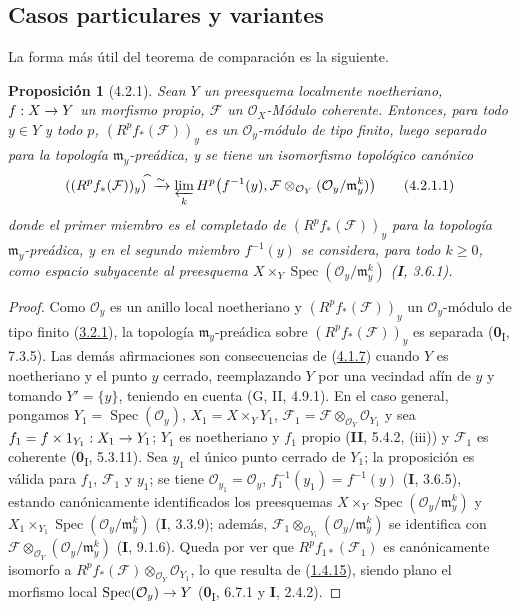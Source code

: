 \documentclass[10pt,oneside,openany]{book}
\theoremstyle{egaenv}\newtheorem*{env}{---}
\theoremstyle{egastatement}
\newtheorem*{proposition}{Proposición}
\theoremstyle{egadescription}
\newcommand{\oldpage}[2][]{\marginnote{\normalfont\scriptsize\textbf{#1}\,|\,#2}\ignorespaces}
\renewcommand{\geq}{\geqslant}
\renewcommand{\to}{\mathchoice{\longrightarrow}{\rightarrow}{\rightarrow}{\rightarrow}}
\begin{document}
\subsection{Casos particulares y variantes}
\label{subsection:III.4.2}
\label{subsection:III.4.2-fr}

La forma más útil del teorema de comparación  es la
siguiente.

\begin{proposition}[4.2.1]
\label{III.4.2.1-fr}
Sean $Y$ un preesquema localmente noetheriano, $f:X\to Y$ un morfismo
propio, $\mathcal F$ un $\mathcal O_X$-Módulo coherente. Entonces, para todo
$y\in Y$ y todo $p$, $(R^pf_*(\mathcal F))_y$ es
\oldpage[III]{130}
un $\mathcal O_y$-módulo de tipo finito, luego separado para la topología
$\mathfrak m_y$-preádica, y se tiene un isomorfismo topológico canónico
\[
((R^pf_*(\mathcal F))_y)^{\widehat{\,}}
\xrightarrow{\sim}
\varprojlim_kH^p\bigl(f^{-1}(y),
\mathcal F\otimes_{\mathcal O_Y}(\mathcal O_y/\mathfrak m_y^k)\bigr)
\tag{4.2.1.1}\label{III.4.2.1.1-fr}
\]
donde el primer miembro es el completado de $(R^pf_*(\mathcal F))_y$ para la
topología $\mathfrak m_y$-preádica, y en el segundo miembro $f^{-1}(y)$ se
considera, para todo $k\geq0$, como espacio subyacente al preesquema
$X\times_Y\operatorname{Spec}(\mathcal O_y/\mathfrak m_y^k)$
\textup{(\textbf{I}, 3.6.1)}.
\end{proposition}

\begin{proof}
Como $\mathcal O_y$ es un anillo local noetheriano y
$(R^pf_*(\mathcal F))_y$ un $\mathcal O_y$-módulo de tipo finito
(\hyperref[III.3.2.1-fr]{3.2.1}), la topología $\mathfrak m_y$-preádica
sobre $(R^pf_*(\mathcal F))_y$ es separada (\textbf{0}\textsubscript{I}, 7.3.5). Las
demás afirmaciones son consecuencias de (\hyperref[III.4.1.7-fr]{4.1.7})
cuando $Y$ es noetheriano y el punto $y$ cerrado, reemplazando $Y$ por una
vecindad afín de $y$ y tomando $Y'=\{y\}$, teniendo en cuenta
(G, II, 4.9.1). En el caso general, pongamos
$Y_1=\operatorname{Spec}(\mathcal O_y)$, $X_1=X\times_YY_1$,
$\mathcal F_1=\mathcal F\otimes_{\mathcal O_Y}\mathcal O_{Y_1}$
y sea $f_1=f\times1_{Y_1}:X_1\to Y_1$; $Y_1$ es noetheriano y $f_1$
propio (\textbf{II}, 5.4.2, (iii)) y $\mathcal F_1$ es coherente
(\textbf{0}\textsubscript{I}, 5.3.11). Sea $y_1$ el único punto cerrado de $Y_1$;
la proposición es válida para $f_1$, $\mathcal F_1$ y $y_1$; se tiene
$\mathcal O_{y_1}=\mathcal O_y$, $f_1^{-1}(y_1)=f^{-1}(y)$ (\textbf{I}, 3.6.5),
estando canónicamente identificados los preesquemas
$X\times_Y\operatorname{Spec}(\mathcal O_y/\mathfrak m_y^k)$ y
$X_1\times_{Y_1}\operatorname{Spec}(\mathcal O_y/\mathfrak m_y^k)$
(\textbf{I}, 3.3.9); además,
$\mathcal F_1\otimes_{\mathcal O_{Y_1}}
(\mathcal O_y/\mathfrak m_y^k)$ se identifica con
$\mathcal F\otimes_{\mathcal O_Y}(\mathcal O_y/\mathfrak m_y^k)$
(\textbf{I}, 9.1.6). Queda por ver que $R^pf_{1*}(\mathcal F_1)$ es
canónicamente isomorfo a
$R^pf_*(\mathcal F)\otimes_{\mathcal O_Y}\mathcal O_{Y_1}$, lo que
resulta de (\hyperref[III.1.4.15-fr]{1.4.15}), siendo plano el morfismo local
$\operatorname{Spec}(\mathcal O_y)\to Y$
(\textbf{0}\textsubscript{I}, 6.7.1 y \textbf{I}, 2.4.2).
\end{proof}
\end{document}
